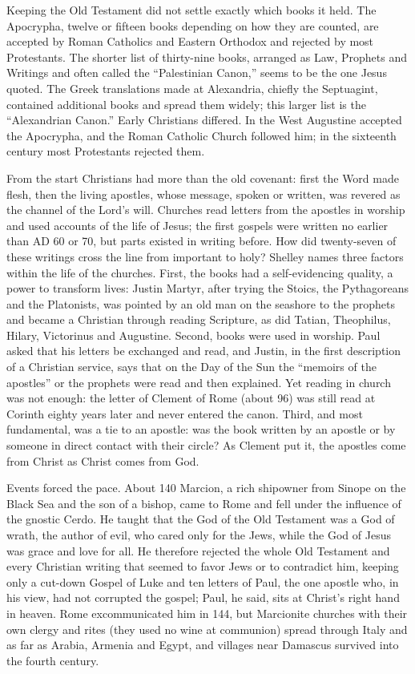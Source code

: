 Keeping the Old Testament did not settle exactly which books it held. The Apocrypha, twelve or fifteen
books depending on how they are counted, are accepted by Roman Catholics and Eastern Orthodox and
rejected by most Protestants. The shorter list of thirty-nine books, arranged as Law, Prophets and
Writings and often called the ``Palestinian Canon,'' seems to be the one Jesus quoted. The Greek
translations made at Alexandria, chiefly the Septuagint, contained additional books and spread them
widely; this larger list is the ``Alexandrian Canon.'' Early Christians differed. In the West
Augustine accepted the Apocrypha, and the Roman Catholic Church followed him; in the sixteenth
century most Protestants rejected them.

From the start Christians had more than the old covenant: first the Word made flesh, then the living
apostles, whose message, spoken or written, was revered as the channel of the Lord's will. Churches
read letters from the apostles in worship and used accounts of the life of Jesus; the first gospels
were written no earlier than AD 60 or 70, but parts existed in writing before. How did twenty-seven
of these writings cross the line from important to holy? Shelley names three factors within the life
of the churches. First, the books had a self-evidencing quality, a power to transform lives: Justin
Martyr, after trying the Stoics, the Pythagoreans and the Platonists, was pointed by an old man on the
seashore to the prophets and became a Christian through reading Scripture, as did Tatian, Theophilus,
Hilary, Victorinus and Augustine. Second, books were used in worship. Paul asked that his letters be
exchanged and read, and Justin, in the first description of a Christian service, says that on the Day
of the Sun the ``memoirs of the apostles'' or the prophets were read and then explained. Yet reading
in church was not enough: the letter of Clement of Rome (about 96) was still read at Corinth eighty
years later and never entered the canon. Third, and most fundamental, was a tie to an apostle: was the
book written by an apostle or by someone in direct contact with their circle? As Clement put it,
the apostles come from Christ as Christ comes from God.

Events forced the pace. About 140 Marcion, a rich shipowner from Sinope on the Black Sea and the son
of a bishop, came to Rome and fell under the influence of the gnostic Cerdo. He taught that the God of
the Old Testament was a God of wrath, the author of evil, who cared only for the Jews, while the God
of Jesus was grace and love for all. He therefore rejected the whole Old Testament and every Christian
writing that seemed to favor Jews or to contradict him, keeping only a cut-down Gospel of Luke and
ten letters of Paul, the one apostle who, in his view, had not corrupted the gospel; Paul, he said,
sits at Christ's right hand in heaven. Rome excommunicated him in 144, but Marcionite churches with
their own clergy and rites (they used no wine at communion) spread through Italy and as far as
Arabia, Armenia and Egypt, and villages near Damascus survived into the fourth century.

